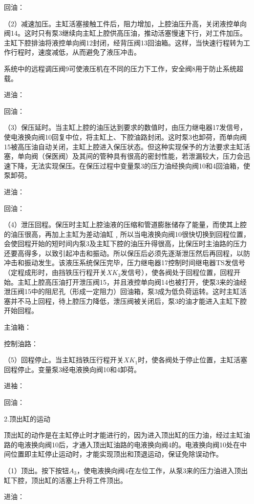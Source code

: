 
\noindent 回油：

（2）减速加压。主缸活塞接触工件后，阻力增加，上腔油压升高，关闭液控单向阀14。这时只有泵3继续向主缸上腔供高压油，推动活塞慢速下行，对工件加压。主缸下腔排油将液控单向阀12封闭，经背压阀13回油箱。这样，当快速行程转为工作行程时，速度减低，从而避免了液压冲击。

系统中的远程调压阀9可使液压机在不同的压力下工作，安全阀8用于防止系统超载。

进油：

回油：

（3）保压延时。当主缸上腔的油压达到要求的数值时，由压力继电器17发信号，使电液换向阀10回复中位，将主缸上、下腔油路封闭。这时泵3也卸荷，而单向阀15被高压油自动关闭，主缸上腔进入保压状态。但这种实现保予的方法要求主缸活塞，单向阀（保医阀）及其间的管种具有很高的密封性能，若泄漏较大，压力会迅速下降，无法实现保压。在保压过程中变量泵3的压力油经换向阀10和4回油箱，使泵卸荷。

进油：

回油：

（4）泄压回程。保压时主缸上腔油液的压缩和管道膨胀储存了能量，而使其上腔的油压很高，再加上主缸为差动油缸﹐所以当电液换向阀10很快切换到回程位置，会使回程开始的短时间内泵3及主缸下腔的油压升得很高，比保压时主油路的压力还要高得多，以致引起冲击和振动。所以保压后必须先逐渐泄压然后再回程，以防冲击和振动发生。该液压系统保压完毕，压力继电器17控制时间继电器TS发信号（定程成形时，由挡铁压行程开关$XK_3$发信号），使各阀处于回程位置，回程开始。主缸上腔高压油打开泄压阀15，并且液控单向阀14也被打开，使泵3来的油经泄压阀15中的阻尼孔（形成一定阻力）回油箱，泵3成为低负荷运转。这时主缸活塞并不马上回程，待上腔压力降低，泄压阀被关闭后，泵3的油才能进入主缸下腔开始回程。

主油箱：

控制油路：

（5）回程停止。当主缸挡铁压行程开关$XK_1$时，使各阀处于停止位置，主缸活塞回程停止。变量泵3经电液换向阀10和4卸荷。

进袖：

回油：

2.顶出缸的运动

顶出缸的动作是在主缸停止时才能进行的，因为进入顶出缸的压力油，经过主缸油路的电液换向阀10后，才通入顶出缸油路的电液换向阀4的。电液换向阀10处在中间位置即主缸停止运动时，才能实现顶出和顶退运动，保证免除误动作。

（1）顶出。按下按钮$A_3$，使电液换向阀4在左位工作，从泵3来的压力油进入顶出缸下腔，顶出缸的活塞上升将工件顶出。

进油：

